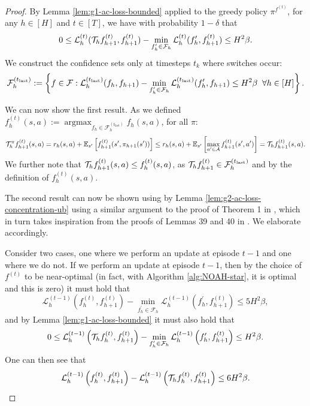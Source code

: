 \begin{proof}
    By Lemma \ref{lem:g1-ac-loss-bounded} applied to the greedy policy $\pi^{f^{(t)}}$, for any $h \in [H]$ and $t \in [T]$, we have with probability $1-\delta$ that
    \begin{align}0 \leq {\mathcal{L}}_h^{(t)}({\mathcal{T}}_h f_{h+1}^{(t)}, f_{h+1}^{(t)}) - \min_{f_h' \in {\mathcal{F}}_h} {\mathcal{L}}_h^{(t)}(f_h', f_{h+1}^{(t)}) \leq H^2\beta.\end{align}    
    We construct the confidence sets only at timesteps $t_k$ where switches occur:
    $${\mathcal{F}}_h^{(t_{\text{last}})} := \left\{f \in {\mathcal{F}} : {\mathcal{L}}_h^{(t_{\text{last}})}(f_h, f_{h+1}) - \min_{f_h' \in {\mathcal{F}}_h} {\mathcal{L}}_h^{(t_{\text{last}})}(f_h', f_{h+1}) \leq H^2\beta \;\; \forall h \in [H] \right\}.$$
    
     We can now show the first result. As we defined $f_h^{(t)}(s,a) :=\operatorname{argmax}_{f_h \in \mathcal{F}_h^{(t_{\text{last}})}} f_h\left(s,a\right)$, for all $\pi$:
    \begin{align}
        {\mathcal{T}}_h^{\pi}f_{h+1}^{(t)}(s,a) = r_h(s,a) + \mathbb{E}_{s'} \left[f_{h+1}^{(t)}(s', \pi_{h+1}(s'))\right] \leq r_h(s,a) + \mathbb{E}_{s'} \left[\max_{a' \in {\mathcal{A}}} f_{h+1}^{(t)}(s', a')\right] = {\mathcal{T}}_h f_{h+1}^{(t)}(s,a).
    \end{align}
    We further note that ${\mathcal{T}}_h f_{h+1}^{(t)}(s,a)\leq f_h^{(t)}(s,a)$, as ${\mathcal{T}}_h f_{h+1}^{(t)}\in\mathcal{F}_h^{(t_{\text{last}})}$ and by the definition of $f_h^{(t)}(s,a)$.

    The second result can now be shown using by Lemma \ref{lem:g2-ac-loss-concentration-ub} using a similar argument to the proof of Theorem 1 in \citet{xiong2023generalframeworksequentialdecisionmaking}, which in turn takes inspiration from the proofs of Lemmas 39 and 40 in \citet{jin2021bellmaneluder}. We elaborate accordingly.
    
    Consider two cases, one where we perform an update at episode $t-1$ and one where we do not. If we perform an update at episode $t-1$, then by the choice of $f^{(t)}$ to be near-optimal (in fact, with Algorithm \ref{alg:NOAH-star}, it is optimal and this is zero) it must hold that
    $$\mathcal{L}_h^{(t-1)}\left(f_h^{(t)}, f_{h+1}^{(t)}\right)-\min _{f_h^{\prime} \in \mathcal{F}_h} \mathcal{L}_h^{(t-1)}\left(f_h^{\prime}, f_{h+1}^{(t)}\right) \leq 5H^2\beta, $$
    and by Lemma \ref{lem:g1-ac-loss-bounded} it must also hold that
    $$0 \leq \mathcal{L}_h^{(t-1)}\left({\mathcal{T}}_h f_h^{(t)}, f_{h+1}^{(t)}\right)-\min _{f_h^{\prime} \in \mathcal{F}_h} \mathcal{L}_h^{(t-1)}\left(f_h^{\prime}, f_{h+1}^{(t)}\right) \leq H^2\beta.$$
    One can then see that
    \begin{align}\mathcal{L}_h^{(t-1)}\left(f_h^{(t)}, f_{h+1}^{(t)}\right) - \mathcal{L}_h^{(t-1)}\left({\mathcal{T}}_h f_h^{(t)}, f_{h+1}^{(t)}\right) \leq 6H^2\beta.\end{align}


\end{proof}
